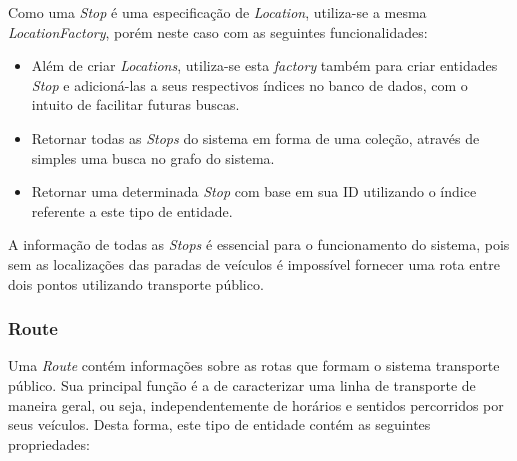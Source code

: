 Como uma \emph{Stop} é uma especificação de \emph{Location}, utiliza-se a mesma \emph{LocationFactory}, porém neste caso com as seguintes funcionalidades:
\begin{itemize}
	\item Além de criar \emph{Locations}, utiliza-se esta \emph{factory} também para criar entidades \emph{Stop} e adicioná-las a seus respectivos índices no banco 		de dados, com o intuito de facilitar futuras buscas.
	\item Retornar todas as \emph{Stops} do sistema em forma de uma coleção, através de simples uma busca no grafo do sistema.
	\item Retornar uma determinada \emph{Stop} com base em sua ID utilizando o índice referente a este tipo de entidade.
\end{itemize}

A informação de todas as \emph{Stops} é essencial para o funcionamento do sistema, pois sem as localizações das paradas de veículos é impossível fornecer uma rota entre dois pontos utilizando transporte público.

\subsubsection{Route}
Uma \emph{Route} contém informações sobre as rotas que formam o sistema transporte público.
Sua principal função é a de caracterizar uma linha de transporte de maneira geral, ou seja, independentemente de horários e sentidos percorridos por seus veículos.
Desta forma, este tipo de entidade contém as seguintes propriedades:

